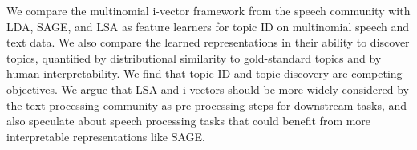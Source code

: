 We compare the multinomial i-vector framework from the speech community with LDA, SAGE, and LSA as feature learners for topic ID on multinomial speech and text data. We also compare the learned representations in their ability to discover topics, quantified by distributional similarity to gold-standard topics and by human interpretability. We find that topic ID and topic discovery are competing objectives. We argue that LSA and i-vectors should be more widely considered by the text processing community as pre-processing steps for downstream tasks, and also speculate about speech processing tasks that could benefit from more interpretable representations like SAGE.
